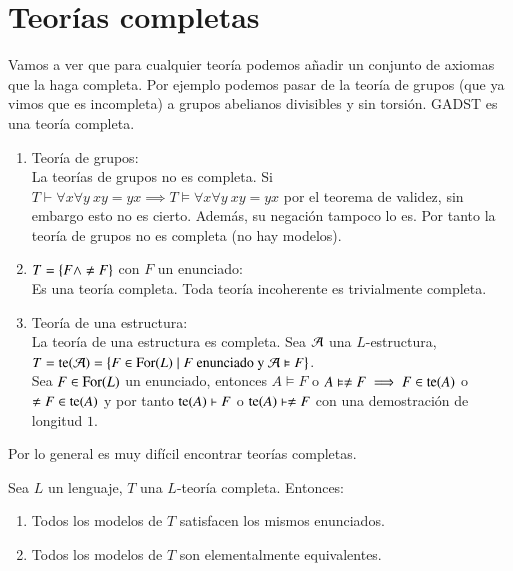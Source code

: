 \section{Teorías completas}

Vamos a ver que para cualquier teoría podemos añadir un conjunto de axiomas que la haga completa. Por ejemplo podemos pasar de la teoría de grupos (que ya vimos que es incompleta)
a grupos abelianos divisibles y sin torsión. GADST es una teoría completa.

\begin{eg}
    \begin{enumerate}[(1)]
        \item Teoría de grupos:\\
        La teorías de grupos no es completa. Si $T \vdash \forall x \forall y\ xy = yx \implies T \vDash \forall x \forall y\ xy=yx$ por el teorema de validez, sin embargo esto no es cierto. Además, su negación tampoco lo es. Por tanto la teoría de grupos no es completa (no hay modelos).
        \item $T = \left\{F \land \neq F\right\}$ con $F$ un enunciado:\\
        Es una teoría completa. Toda teoría incoherente es trivialmente completa.
        \item Teoría de una estructura:\\
        La teoría de una estructura es completa. Sea $\mathcal{A}$ una $L$-estructura, $T = \mathrm{te}(\mathcal{A}) = \left\{ F \in \mathrm{For}(L) \mid F \text{ enunciado y } \mathcal{A} \vDash F\right\}$.\\
        Sea $F\in \mathrm{For}(L)$ un enunciado, entonces $A \vDash F$ o $A \vDash \neq F \implies F \in \mathrm{te}(A)$ o $\neq F \in \mathrm{te}(A)$ y por tanto $\mathrm{te}(A) \vdash F$ o $\mathrm{te}(A) \vdash \neq F$ con una demostración de longitud $1$.
    \end{enumerate}
\end{eg}

\begin{obs}
    Por lo general es muy difícil encontrar teorías completas.
\end{obs}

\begin{pro}\label{pro:3.2}
    Sea $L$ un lenguaje, $T$ una $L$-teoría completa. Entonces:
    \begin{enumerate}
        \item Todos los modelos de $T$ satisfacen los mismos enunciados.
        \item Todos los modelos de $T$ son elementalmente equivalentes.
    \end{enumerate}
\end{pro}

